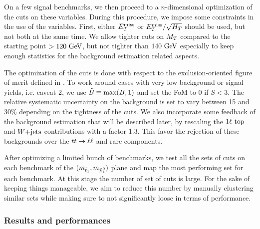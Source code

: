     On a few signal benchmarks, we then proceed to a $n$-dimensional
    optimization of the cuts on these variables. During this procedure, we
    impose some constraints in the use of the variables.  First, either $E_T^\text{miss}$
    or $E_T^\text{miss}/\sqrt{H_T}$ should be used, but not both at the same time.  We
    allow tighter cuts on $M_T$ compared to the starting point $> 120~\text{GeV}$, but
    not tighter than $140~\text{GeV}$ especially to keep enough statistics for the
    background estimation related aspects.

    The optimization of the cuts is done with respect to the exclusion-oriented
    figure of merit defined in . To work around cases with very
    low background or signal yields, i.e. caveat 2, we use $\tilde{B} \equiv
    \text{max}(B,1)$ and set the FoM to 0 if $S < 3$. The relative systematic
    uncertainty on the background is set to vary between 15 and 30\% depending
    on the tightness of the cuts. We also incorporate some feedback of the
    background estimation that will be described later, by rescaling the
    $1\ell~\text{top}$ and $\text{$W$+jets}$ contributions with a factor 1.3. This favor the
    rejection of these backgrounds over the $t\bar{t} \rightarrow \ell \ell$ and rare components.

    After optimizing a limited bunch of benchmarks, we test all the sets of cuts
    on each benchmark of the $(m_{\tilde{t}_1},m_{\tilde{\chi}_1^0})$ plane and map
    the most performing set for each benchmark. At this stage the number of set
    of cuts is large. For the sake of keeping things manageable, we aim to
    reduce this number by manually clustering similar sets while making sure to
    not significantly loose in terms of performance.

        \subsubsection{Results and performances \label{sec:cutAndCountPerformances}}

